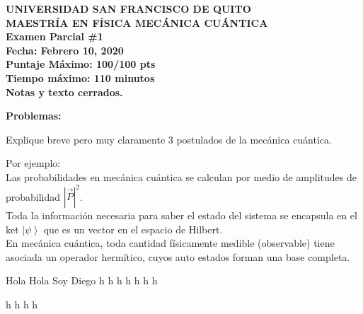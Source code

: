 \documentclass[answers,11pt]{exam}
\newcommand{\abs}[1]{\left| #1 \right|} %
\newcommand{\ket}[1]{\left| #1 \right>} %
\renewcommand{\=}[1]{\stackrel{#1}{=}} %
\theoremstyle{definition}
\theoremstyle{remark}
\begin{document}
\begin{center}
{\bf UNIVERSIDAD SAN FRANCISCO DE QUITO\\
MAESTRÍA EN FÍSICA
MECÁNICA CUÁNTICA \\ 
Examen Parcial \#1 \\ 
Fecha: Febrero 10, 2020 \\
Puntaje Máximo: 100/100 pts\\
Tiempo máximo: 110 minutos \\ 
Notas y texto cerrados.\\
}
\end{center}
\vspace{0.1in}


{\bf Problemas:}\\

\begin{questions}


\question [10] Explique breve pero muy claramente 3 postulados de la
mecánica cuántica.

\begin{solution}
Por ejemplo:\\

Las probabilidades en mecánica cuántica se calculan por medio de amplitudes de probabilidad $\abs {\vec{P}}^{2}$. \\

Toda la información necesaria para saber el estado del sistema se encapsula en el ket $\ket{ \psi}$ que es un vector en el espacio de Hilbert. \\

En mecánica cuántica, toda cantidad físicamente medible (observable) tiene asociada un operador hermítico, cuyos auto estados forman una base completa.\\

\end{solution}
Hola
Hola Soy Diego
h
h
h
h
h
h
h

h
h
h
h

\end{questions}
\end{document}
